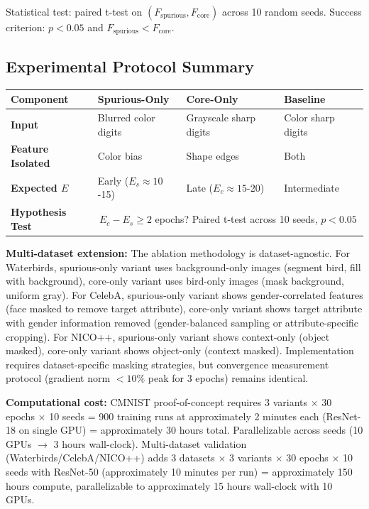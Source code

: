 Statistical test: paired t-test on $(F_{\text{spurious}}, F_{\text{core}})$ across 10 random seeds. Success criterion: $p < 0.05$ and $F_{\text{spurious}} < F_{\text{core}}$.

\subsection{Experimental Protocol Summary}

\begin{table}[h]
\centering
\small
\begin{tabular}{llll}
\toprule
\textbf{Component} & \textbf{Spurious-Only} & \textbf{Core-Only} & \textbf{Baseline} \\
\midrule
\textbf{Input} & Blurred color digits & Grayscale sharp digits & Color sharp digits \\
\textbf{Feature Isolated} & Color bias & Shape edges & Both \\
\textbf{Expected $E$} & Early ($E_s \approx 10$-15) & Late ($E_c \approx 15$-20) & Intermediate \\
\textbf{Hypothesis Test} & \multicolumn{3}{c}{$E_c - E_s \geq 2$ epochs? Paired t-test across 10 seeds, $p < 0.05$} \\
\bottomrule
\end{tabular}
\end{table}

\textbf{Multi-dataset extension:} The ablation methodology is dataset-agnostic. For Waterbirds, spurious-only variant uses background-only images (segment bird, fill with background), core-only variant uses bird-only images (mask background, uniform gray). For CelebA, spurious-only variant shows gender-correlated features (face masked to remove target attribute), core-only variant shows target attribute with gender information removed (gender-balanced sampling or attribute-specific cropping). For NICO++, spurious-only variant shows context-only (object masked), core-only variant shows object-only (context masked). Implementation requires dataset-specific masking strategies, but convergence measurement protocol (gradient norm $< 10\%$ peak for 3 epochs) remains identical.

\textbf{Computational cost:} CMNIST proof-of-concept requires 3 variants $\times$ 30 epochs $\times$ 10 seeds = 900 training runs at approximately 2 minutes each (ResNet-18 on single GPU) = approximately 30 hours total. Parallelizable across seeds (10 GPUs $\rightarrow$ 3 hours wall-clock). Multi-dataset validation (Waterbirds/CelebA/NICO++) adds 3 datasets $\times$ 3 variants $\times$ 30 epochs $\times$ 10 seeds with ResNet-50 (approximately 10 minutes per run) = approximately 150 hours compute, parallelizable to approximately 15 hours wall-clock with 10 GPUs.

